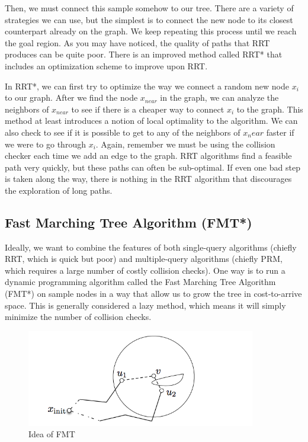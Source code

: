 \documentclass[twoside]{article}
\begin{document}
Then, we must connect this sample somehow to our tree. There are a variety of strategies we can use, but the simplest is to connect the new node to its closest counterpart already on the graph. We keep repeating this process until we reach the goal region. As you may have noticed, the quality of paths that RRT produces can be quite poor. There is an improved method called RRT* that includes an optimization scheme to improve upon RRT.

In RRT*, we can first try to optimize the way we connect a random new node $x_i$ to our graph. After we find the node $x_{near}$ in the graph, we can analyze the neighbors of $x_{near}$ to see if there is a cheaper way to connect $x_i$ to the graph. This method at least introduces a notion of local optimality to the algorithm. We can also check to see if it is possible to get to any of the neighbors of $x_near$ faster if we were to go through $x_i$. Again, remember we must be using the collision checker each time we add an edge to the graph. RRT algorithms find a feasible path very quickly, but these paths can often be sub-optimal. If even one bad step is taken along the way, there is nothing in the RRT algorithm that discourages the exploration of long paths. 

\subsection{Fast Marching Tree Algorithm (FMT*)}
Ideally, we want to combine the features of both single-query algorithms (chiefly RRT, which is quick but poor) and multiple-query algorithms (chiefly PRM, which requires a large number of costly collision checks). One way is to run a dynamic programming algorithm called the Fast Marching Tree Algorithm (FMT*) on sample nodes in a way that allow us to grow the tree in cost-to-arrive space. This is generally considered a lazy method, which means it will simply minimize the number of collision checks.

\begin{figure}[h!]
  \centering
  \includegraphics[width=100mm]{fmt.png}
  \caption{Idea of FMT}
  \label{fig:plot_Idea}
\end{figure}
\end{document}
